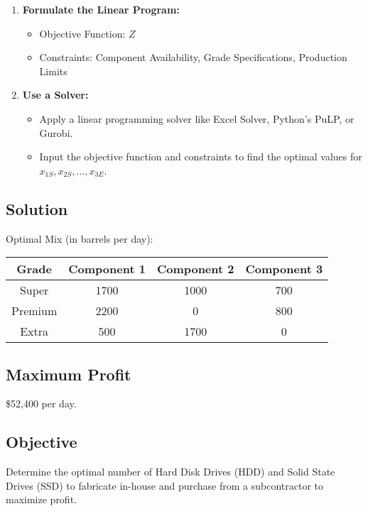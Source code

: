 \documentclass[12pt]{article}
\begin{document}
\begin{enumerate}
    \item \textbf{Formulate the Linear Program:}
    \begin{itemize}
        \item Objective Function: \( Z \)
        \item Constraints: Component Availability, Grade Specifications, Production Limits
    \end{itemize}
    
    \item \textbf{Use a Solver:}
    \begin{itemize}
        \item Apply a linear programming solver like Excel Solver, Python's PuLP, or Gurobi.
        \item Input the objective function and constraints to find the optimal values for \( x_{1S}, x_{2S}, \ldots, x_{3E} \).
    \end{itemize}
\end{enumerate}

\subsection*{Solution}
Optimal Mix (in barrels per day):

\begin{tabular}{|c|c|c|c|}
\hline
Grade & Component 1 & Component 2 & Component 3 \\
\hline
Super & 1700 & 1000 & 700 \\
Premium & 2200 & 0 & 800 \\
Extra & 500 & 1700 & 0 \\
\hline
\end{tabular}

\subsection*{Maximum Profit}
\$52,400 per day.
\vspace{290pt}
\newpage



\subsection*{Objective}
Determine the optimal number of Hard Disk Drives (HDD) and Solid State Drives (SSD) to fabricate in-house and purchase from a subcontractor to maximize profit.
\end{document}
